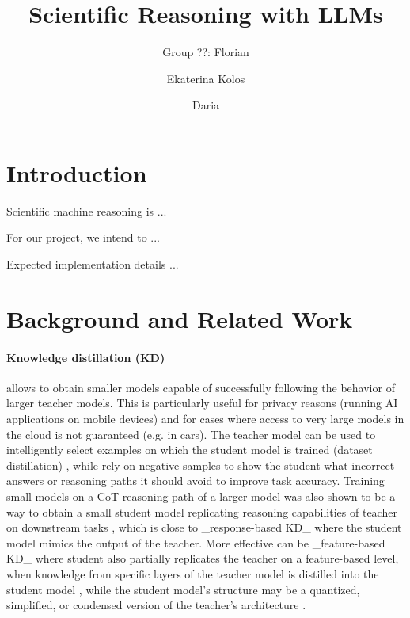 \documentclass{article}
\begin{document}
\title{Scientific Reasoning with LLMs}

\author{Group ??: Florian \and Ekaterina Kolos \and Daria }

\maketitle             


\section{Introduction}

Scientific machine reasoning is ... 

For our project, we intend to ...

Expected implementation details ...

\section{Background and Related Work}

\paragraph{Knowledge distillation (KD)} allows to obtain smaller models capable of successfully following the behavior of larger teacher models. This is particularly useful for privacy reasons (running AI applications on mobile devices) and for cases where access to very large models in the cloud is not guaranteed (e.g. in cars). The teacher model can be used to intelligently select examples on which the student model is trained (dataset distillation) \cite{yu2023dataset}, while \cite{li2024turning} rely on negative samples to show the student what incorrect answers or reasoning paths it should avoid to improve task accuracy. Training small models on a CoT reasoning path of a larger model was also shown to be a way to obtain a small student model replicating reasoning capabilities of teacher on downstream tasks \cite{magister2022teaching}, which is close to _response-based KD_ where the student model mimics the output of the teacher. More effective can be _feature-based KD_ where student also partially replicates the teacher on a feature-based level, when knowledge from specific layers of the teacher model is distilled into the student model \cite{sepahvand2022teacher}, while the student model's structure may be a quantized, simplified, or condensed version of the teacher's architecture \cite{gou2021knowledge}. 
\end{document}
